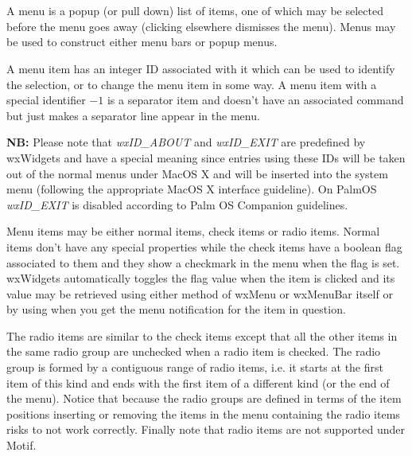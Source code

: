 
\section{}\label{wxmenu}

A menu is a popup (or pull down) list of items, one of which may be
selected before the menu goes away (clicking elsewhere dismisses the
menu). Menus may be used to construct either menu bars or popup menus.

A menu item has an integer ID associated with it which can be used to
identify the selection, or to change the menu item in some way. A menu item
with a special identifier $-1$ is a separator item and doesn't have an
associated command but just makes a separator line appear in the menu.

{\bf NB:} Please note that {\it wxID\_ABOUT} and {\it wxID\_EXIT} are
predefined by wxWidgets and have a special meaning since entries
using these IDs will be taken out of the normal menus under MacOS X
and will be inserted into the system menu (following the appropriate
MacOS X interface guideline). On PalmOS {\it wxID\_EXIT} is disabled according
to Palm OS Companion guidelines.

Menu items may be either normal items, check items or radio items. Normal items
don't have any special properties while the check items have a boolean flag
associated to them and they show a checkmark in the menu when the flag is set.
wxWidgets automatically toggles the flag value when the item is clicked and its
value may be retrieved using either  method
of wxMenu or wxMenuBar itself or by using 
 when you get the menu
notification for the item in question.

The radio items are similar to the check items except that all the other items
in the same radio group are unchecked when a radio item is checked. The radio
group is formed by a contiguous range of radio items, i.e. it starts at the
first item of this kind and ends with the first item of a different kind (or
the end of the menu). Notice that because the radio groups are defined in terms
of the item positions inserting or removing the items in the menu containing
the radio items risks to not work correctly. Finally note that radio items
are not supported under Motif.

